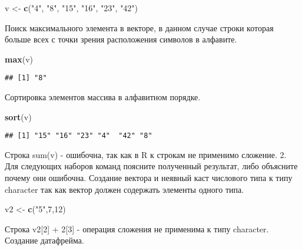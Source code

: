 \documentclass[]{article}
\newenvironment{Shaded}{\begin{snugshade}}{\end{snugshade}}
\newcommand{\KeywordTok}[1]{\textcolor[rgb]{0.13,0.29,0.53}{\textbf{#1}}}
\newcommand{\DecValTok}[1]{\textcolor[rgb]{0.00,0.00,0.81}{#1}}
\newcommand{\StringTok}[1]{\textcolor[rgb]{0.31,0.60,0.02}{#1}}
\newcommand{\NormalTok}[1]{#1}
\begin{document}
\begin{Shaded}
\begin{Highlighting}[]
\NormalTok{v <-}\StringTok{ }\KeywordTok{c}\NormalTok{(}\StringTok{"4"}\NormalTok{, }\StringTok{"8"}\NormalTok{, }\StringTok{"15"}\NormalTok{, }\StringTok{"16"}\NormalTok{, }\StringTok{"23"}\NormalTok{, }\StringTok{"42"}\NormalTok{)}
\end{Highlighting}
\end{Shaded}

Поиск максимального элемента в векторе, в данном случае строки которая
больше всех с точки зрения расположения символов в алфавите.

\begin{Shaded}
\begin{Highlighting}[]
\KeywordTok{max}\NormalTok{(v)}
\end{Highlighting}
\end{Shaded}

\begin{verbatim}
## [1] "8"
\end{verbatim}

Сортировка элементов массива в алфавитном порядке.

\begin{Shaded}
\begin{Highlighting}[]
\KeywordTok{sort}\NormalTok{(v)}
\end{Highlighting}
\end{Shaded}

\begin{verbatim}
## [1] "15" "16" "23" "4"  "42" "8"
\end{verbatim}

Строка sum(v) - ошибочна, так как в R к строкам не применимо сложение.
2. Для следующих наборов команд поясните полученный результат, либо
объясните почему они ошибочна. Создание вектора и неявный каст числового
типа к типу character так как вектор должен содержать элементы одного
типа.

\begin{Shaded}
\begin{Highlighting}[]
\NormalTok{v2 <-}\StringTok{ }\KeywordTok{c}\NormalTok{(}\StringTok{"5"}\NormalTok{,}\DecValTok{7}\NormalTok{,}\DecValTok{12}\NormalTok{)}
\end{Highlighting}
\end{Shaded}

Строка v2{[}2{]} + 2{[}3{]} - операция сложения не применима к типу
character. Создание датафрейма.
\end{document}
